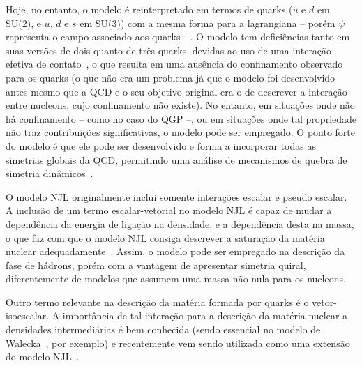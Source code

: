 Hoje, no entanto, o modelo é reinterpretado em termos de quarks ($u$ e $d$ em SU(2), e $u$, $d$ e $s$ em SU(3)) com a mesma forma para a lagrangiana -- porém $\psi$ representa o campo associado aos quarks~--. O modelo tem deficiências tanto em suas versões de dois quanto de três quarks, devidas ao uso de uma interação efetiva de contato~\cite{Klevansky}, o que resulta em uma ausência do confinamento observado para os quarks (o que não era um problema já que o modelo foi desenvolvido antes mesmo que a QCD e o seu objetivo original era o de descrever a interação entre nucleons, cujo confinamento não existe). No entanto, em situações onde não há confinamento -- como no caso do QGP --, ou em situações onde tal propriedade não traz contribuições significativas, o modelo pode ser empregado. O ponto forte do modelo é que ele pode ser desenvolvido e forma a incorporar todas as simetrias globais da QCD, permitindo uma análise de mecanismos de quebra de simetria dinâmicos~\cite{Vogl}.


O modelo NJL originalmente inclui somente interações escalar e pseudo escalar. A inclusão de um termo escalar-vetorial no modelo NJL é capaz de mudar a dependência da energia de ligação na densidade, e a dependência desta na massa, o que faz com que o modelo NJL consiga descrever a saturação da matéria nuclear adequadamente~\cite{Koch}. Assim, o modelo pode ser empregado na descrição da fase de hádrons, porém com a vantagem de apresentar simetria quiral, diferentemente de modelos que assumem uma massa não nula para os nucleons. 

Outro termo relevante na descrição da matéria formada por quarks é o vetor-isoescalar. A importância de tal interação para a descrição da matéria nuclear a densidades intermediárias é bem conhecida (sendo essencial no modelo de Walecka~\cite{Advances16}, por exemplo) e recentemente vem sendo utilizada como uma extensão do modelo NJL~\cite{Abuki, NJLv}.

